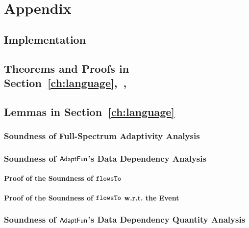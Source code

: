 \chapter{Appendix}
\label{AppC}


\section{Implementation}
\label{appendix:implementation}


\section{Theorems and Proofs in Section~\ref{ch:language},~,~}
\label{appendix:thm-adaptivity}
\section{Lemmas in Section~\ref{ch:language}}
\label{apdx:lemma_sec123}

\clearpage
\subsection{Soundness of Full-Spectrum Adaptivity Analysis}
\label{apdx:adapt_soundness}


\clearpage
\subsection{Soundness of $\textsf{AdaptFun}$'s Data Dependency Analysis}
\subsubsection{Proof of the Soundness of $\mathtt{flowsTo}$}
\label{apdx:flowsto_soundness}

\clearpage
\subsubsection{Proof of the Soundness of $\mathtt{flowsTo}$ w.r.t. the Event}
\label{apdx:flowsto_event_soundness}


\clearpage
\subsection{Soundness of $\textsf{AdaptFun}$'s Data Dependency Quantity Analysis}
\label{apdx:reachability_soundness}

\clearpage
